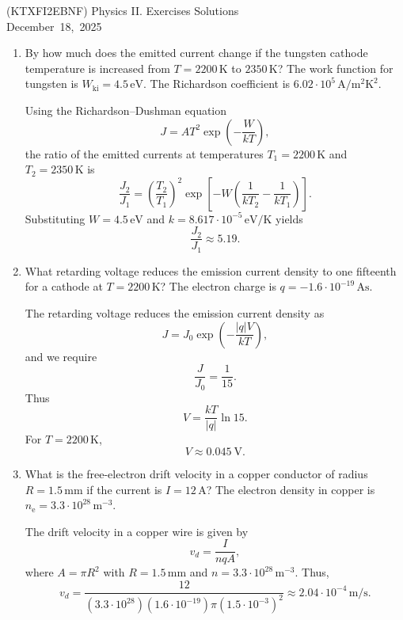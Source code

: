 \documentclass[a4paper,12pt]{letter}
\begin{document}
\begin{center}
 (KTXFI2EBNF) Physics II. Exercises Solutions\\ \smallskip
 December~18,~2025
\end{center}


\begin{enumerate}


 \item By how much does the emitted current change if the tungsten cathode temperature is increased from $T = 2200\,\text{K}$ to $2350\,\text{K}$?  
  The work function for tungsten is $W_{\text{ki}} = 4.5\,\text{eV}$.  
  The Richardson coefficient is $6.02 \cdot 10^{5}\,\text{A}/\text{m}^2\text{K}^2$.

  \smallskip
  
Using the Richardson--Dushman equation
\[
J = A T^{2} \exp\!\left(-\frac{W}{k T}\right),
\]
the ratio of the emitted currents at temperatures $T_1 = 2200\,\text{K}$ and $T_2 = 2350\,\text{K}$ is
\[
\frac{J_2}{J_1}
= \left(\frac{T_2}{T_1}\right)^{2}
\exp\!\left[
- W \left(\frac{1}{kT_2} - \frac{1}{kT_1}\right)
\right].
\]
Substituting $W = 4.5\,\text{eV}$ and $k = 8.617 \cdot 10^{-5}\,\text{eV/K}$ yields
\[
\frac{J_2}{J_1} \approx 5.19.
\]

 \item What retarding voltage reduces the emission current density to one fifteenth for a cathode at $T = 2200\,\text{K}$?  
  The electron charge is $q = -1.6 \cdot 10^{-19}\,\text{As}$.

\smallskip

 
The retarding voltage reduces the emission current density as
\[
J = J_0 \exp\!\left(-\frac{|q|V}{kT}\right),
\]
and we require
\[
\frac{J}{J_0} = \frac{1}{15}.
\]
Thus
\[
V = \frac{kT}{|q|} \ln 15.
\]
For $T = 2200\,\text{K}$,
\[
V \approx 0.045\ \text{V}.
\]


  \item What is the free-electron drift velocity in a copper conductor of radius $R = 1.5\,\text{mm}$ if the current is $I = 12\,\text{A}$?  
  The electron density in copper is $n_{\text{e}} = 3.3 \cdot 10^{28}\,\text{m}^{-3}$.

  \smallskip
  
The drift velocity in a copper wire is given by
\[
v_d = \frac{I}{n q A},
\]
where $A = \pi R^{2}$ with $R = 1.5\,\text{mm}$ and $n = 3.3 \cdot 10^{28}\,\text{m}^{-3}$.
Thus,
\[
v_d = \frac{12}{(3.3 \cdot 10^{28})(1.6 \cdot 10^{-19}) \pi (1.5 \cdot 10^{-3})^{2}}
\approx 2.04 \cdot 10^{-4}\,\text{m/s}.
\]


\end{enumerate}
\end{document}
